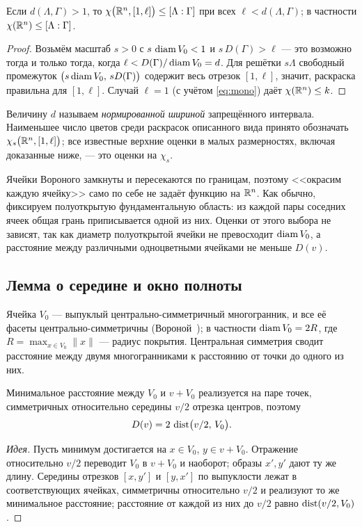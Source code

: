 \begin{proposition}\label{prop:crit}
Если $d(\Lambda,\Gamma)>1$, то $\chi\bigl(\mathbb{R}^n,[1,\ell]\bigr)\le[\Lambda:\Gamma]$
при всех $\ell<d(\Lambda,\Gamma)$; в частности $\chi(\mathbb{R}^n)\le[\Lambda:\Gamma]$.
\end{proposition}
\begin{proof}
Возьмём масштаб $s>0$ с $s\,\operatorname{diam} V_0<1$ и $s\,D(\Gamma)>\ell$ --- это возможно
тогда и только тогда, когда $\ell<D(\Gamma)/\operatorname{diam} V_0=d$. Для решётки $s\Lambda$
свободный промежуток $\bigl(s\operatorname{diam} V_0,\,sD(\Gamma)\bigr)$ содержит весь отрезок
$[1,\ell]$, значит, раскраска правильна для $[1,\ell]$. Случай $\ell=1$ (с учётом
\eqref{eq:mono}) даёт $\chi(\mathbb{R}^n)\le k$.
\end{proof}

Величину $d$ называем \emph{нормированной шириной} запрещённого интервала.
Наименьшее число цветов среди раскрасок описанного вида принято обозначать
$\chi_s\bigl(\mathbb{R}^n,[1,\ell]\bigr)$; все известные верхние оценки в малых
размерностях, включая доказанные ниже, --- это оценки на $\chi_s$.

\begin{remark}\label{rem:halfopen}
Ячейки Вороного замкнуты и пересекаются по границам, поэтому <<окрасим каждую
ячейку>> само по себе не задаёт функцию на $\mathbb{R}^n$. Как обычно, фиксируем
полуоткрытую фундаментальную область: из каждой пары соседних ячеек общая
грань приписывается одной из них. Оценки от этого выбора не зависят, так как
диаметр полуоткрытой ячейки не превосходит $\operatorname{diam} V_0$, а расстояние между
различными одноцветными ячейками не меньше $D(v)$.
\end{remark}

\subsection{Лемма о середине и окно полноты}

Ячейка $V_0$ --- выпуклый центрально-симметричный многогранник, и все её
фасеты центрально-симметричны (Вороной~\cite{Voronoi}); в частности
$\operatorname{diam} V_0=2R$, где $R=\max_{x\in V_0}\|x\|$ --- радиус покрытия. Центральная
симметрия сводит расстояние между двумя многогранниками к расстоянию от точки
до одного из них.

\begin{lemma}\label{lem:mid}
Минимальное расстояние между $V_0$ и $v+V_0$ реализуется на паре точек,
симметричных относительно середины $v/2$ отрезка центров, поэтому
\begin{equation}\label{eq:mid}
D(v)=2\,\operatorname{dist}\bigl(v/2,\,V_0\bigr).
\end{equation}
\end{lemma}
\begin{proof}[Идея]
Пусть минимум достигается на $x\in V_0$, $y\in v+V_0$. Отражение относительно
$v/2$ переводит $V_0$ в $v+V_0$ и наоборот; образы $x',y'$ дают ту же длину.
Середины отрезков $[x,y']$ и $[y,x']$ по выпуклости лежат в соответствующих
ячейках, симметричны относительно $v/2$ и реализуют то же минимальное
расстояние; расстояние от каждой из них до $v/2$ равно $\operatorname{dist}(v/2,V_0)$.
\end{proof}


